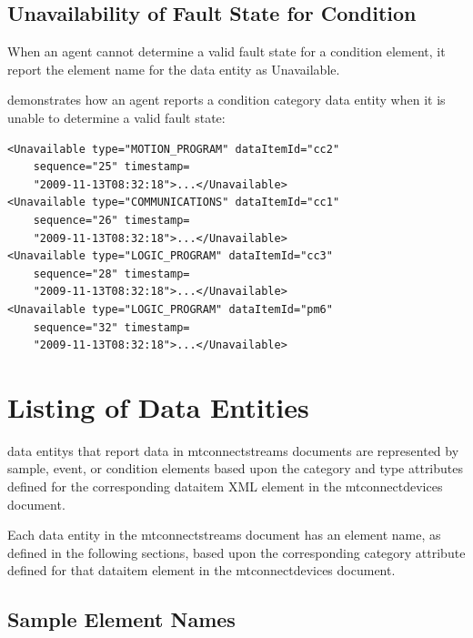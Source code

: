 \documentclass{mtconnect}	%
\begin{document}
\subsection{Unavailability of Fault State for Condition}\label{sec:Unavailability of Fault State for Condition}

When an \gls{agent} cannot determine a valid \gls{fault state} for a \gls{condition} element, it \must report the \gls{element name} for the \gls{data entity} as Unavailable.

 demonstrates how an \gls{agent} reports a \gls{condition} category \gls{data entity} when it is unable to determine a valid \gls{fault state}:

\begin{lstlisting}[firstnumber=1,escapechar=|,%
    caption={Example of Condition when Fault State is UNAVAILABLE},label={lst:example-of-condition-when-fault-state-is-unavailable}]
<Unavailable type="MOTION_PROGRAM" dataItemId="cc2" 
    sequence="25" timestamp=
    "2009-11-13T08:32:18">...</Unavailable>
<Unavailable type="COMMUNICATIONS" dataItemId="cc1" 
    sequence="26" timestamp=
    "2009-11-13T08:32:18">...</Unavailable>
<Unavailable type="LOGIC_PROGRAM" dataItemId="cc3"
    sequence="28" timestamp=
    "2009-11-13T08:32:18">...</Unavailable>
<Unavailable type="LOGIC_PROGRAM" dataItemId="pm6"
    sequence="32" timestamp=
    "2009-11-13T08:32:18">...</Unavailable>
\end{lstlisting}

\section{Listing of Data Entities}\label{sec:Listing of Data Entities}

\glspl{data entity} that report data in \gls{mtconnectstreams} documents are represented by \gls{sample}, \gls{event}, or \gls{condition} elements based upon the \gls{category} and \gls{type} attributes defined for the corresponding \gls{dataitem} XML element in the \gls{mtconnectdevices} document.

Each \gls{data entity} in the \gls{mtconnectstreams} document has an \gls{element name}, as defined in the following sections, based upon the corresponding \gls{category} attribute defined for that \gls{dataitem} element in the \gls{mtconnectdevices} document.

\subsection{Sample Element Names}\label{sec:Sample Element Names}
\end{document}
